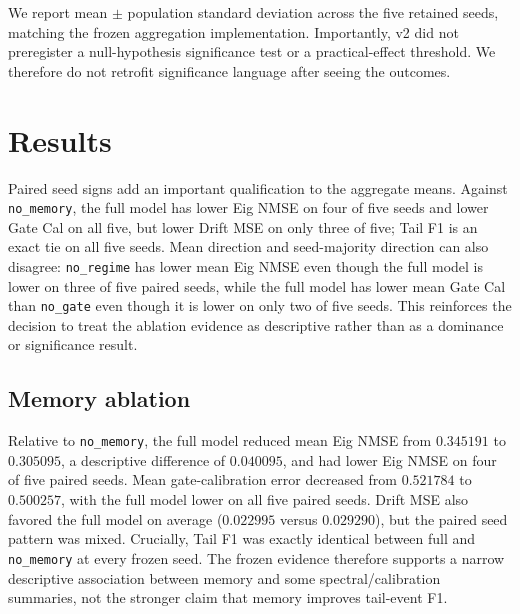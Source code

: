 \documentclass[11pt]{article}
\begin{document}
We report mean $\pm$ population standard deviation across the five retained seeds, matching the frozen aggregation implementation. Importantly, v2 did not preregister a null-hypothesis significance test or a practical-effect threshold. We therefore do not retrofit significance language after seeing the outcomes.

\section{Results}
\begin{table}[H]
\centering
\small

\caption{Frozen five-seed final-rigor v2 results. Lower is better for error metrics; higher is better for Tail F1 and Regime Accuracy. Values are mean $\pm$ population standard deviation across seeds $\{7,19,31,43,59\}$.}
\label{tab:v2}
\end{table}

\begin{table}[H]
\centering
\scriptsize

\caption{Paired seed-level descriptive differences for the same frozen runs. Mean $\Delta$ is full minus ablation. ``Full better'' and ``Ablation better'' respect the metric direction shown by the arrow; ties are exact retained equalities. These counts are descriptive summaries, not an inferential test, and no post-outcome significance or practical-effect gate is introduced.}
\label{tab:paired}
\end{table}

Paired seed signs add an important qualification to the aggregate means. Against \texttt{no\_memory}, the full model has lower Eig NMSE on four of five seeds and lower Gate Cal on all five, but lower Drift MSE on only three of five; Tail F1 is an exact tie on all five seeds. Mean direction and seed-majority direction can also disagree: \texttt{no\_regime} has lower mean Eig NMSE even though the full model is lower on three of five paired seeds, while the full model has lower mean Gate Cal than \texttt{no\_gate} even though it is lower on only two of five seeds. This reinforces the decision to treat the ablation evidence as descriptive rather than as a dominance or significance result.

\subsection{Memory ablation}
Relative to \texttt{no\_memory}, the full model reduced mean Eig NMSE from $0.345191$ to $0.305095$, a descriptive difference of $0.040095$, and had lower Eig NMSE on four of five paired seeds. Mean gate-calibration error decreased from $0.521784$ to $0.500257$, with the full model lower on all five paired seeds. Drift MSE also favored the full model on average ($0.022995$ versus $0.029290$), but the paired seed pattern was mixed. Crucially, Tail F1 was exactly identical between full and \texttt{no\_memory} at every frozen seed. The frozen evidence therefore supports a narrow descriptive association between memory and some spectral/calibration summaries, not the stronger claim that memory improves tail-event F1.
\end{document}

